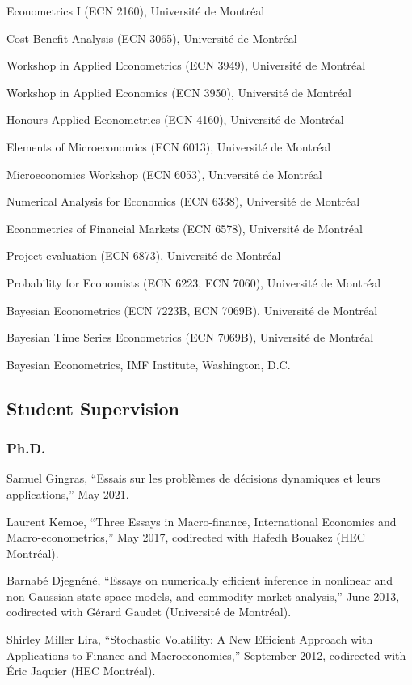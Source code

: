 \documentclass[12pt]{article}
\begin{document}
Econometrics I (ECN 2160), Universit\'e de Montr\'eal

Cost-Benefit Analysis (ECN 3065), Universit\'e de Montr\'eal

Workshop in Applied Econometrics (ECN 3949), Universit\'e de Montr\'eal

Workshop in Applied Economics (ECN 3950), Universit\'e de Montr\'eal

Honours Applied Econometrics (ECN 4160), Universit\'e de Montr\'eal

Elements of Microeconomics (ECN 6013), Universit\'e de Montr\'eal

Microeconomics Workshop (ECN 6053), Universit\'e de Montr\'eal

Numerical Analysis for Economics (ECN 6338), Universit\'e de Montr\'eal

Econometrics of Financial Markets (ECN 6578), Universit\'e de Montr\'eal

Project evaluation (ECN 6873), Universit\'e de Montr\'eal

Probability for Economists (ECN 6223, ECN 7060), Universit\'e de Montr\'eal

Bayesian Econometrics (ECN 7223B, ECN 7069B), Universit\'e de Montr\'eal

Bayesian Time Series Econometrics (ECN 7069B), Universit\'e de Montr\'eal

Bayesian Econometrics, IMF Institute, Washington, D.C.

\subsection*{Student Supervision}

\subsubsection*{Ph.D.}

Samuel Gingras, ``Essais sur les probl\`emes de d\'ecisions dynamiques et leurs applications,''
May 2021.

Laurent Kemoe, ``Three Essays in Macro-finance, International Economics and Macro-econometrics,''
May 2017, codirected with Hafedh Bouakez (HEC Montr\'eal).

Barnab\'e Djegn\'en\'e,
``Essays on numerically efficient inference in nonlinear and non-Gaussian state space models, and commodity market analysis,''
June 2013, codirected with G\'erard Gaudet (Universit\'e de Montr\'eal).

Shirley Miller Lira,
``Stochastic Volatility: A New Efficient Approach with Applications to Finance and Macroeconomics,''
September 2012, codirected with \'Eric Jaquier (HEC Montr\'eal).
\end{document}
